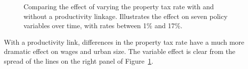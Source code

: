 \begin{figure}[h!tb]
       \caption[Comparing the effect of varying the property tax rate with and without a productivity linkage]{Comparing the effect of varying the property tax rate with and without a productivity linkage. Illustrates the effect on seven policy variables over time, with rates between 1\% and 17\%.}
    \label{fig:Productivity_link_W-WO-property_tax}
\end{figure}
With a productivity link, differences in the property tax rate have a much more dramatic effect on wages and urban size. The variable effect is clear from the spread of the lines on the right panel of Figure~\ref{fig:Productivity_link_W-WO-property_tax}.   %




